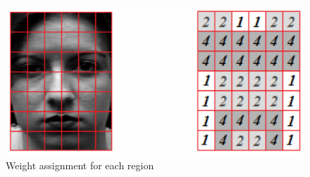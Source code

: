 \begin{figure}[!h]
\begin{center}
\noindent \includegraphics[scale=0.5]{figures/lbp_region_weight} 
\newline
\caption{Weight assignment for each region}
\label{lbp_region_weight}
\end{center} 
\end{figure}
